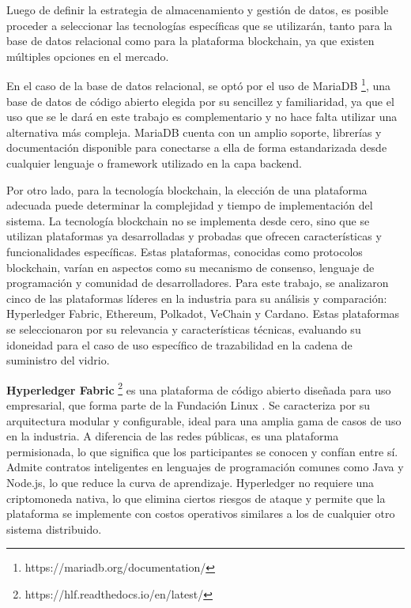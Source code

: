 Luego de definir la estrategia de almacenamiento y gestión de datos, es posible proceder a seleccionar las tecnologías específicas que se utilizarán, tanto para la base de datos relacional como para la plataforma blockchain, ya que existen múltiples opciones en el mercado.

En el caso de la base de datos relacional, se optó por el uso de MariaDB \footnote{https://mariadb.org/documentation/}, una base de datos de código abierto elegida por su sencillez y familiaridad, ya que el uso que se le dará en este trabajo es complementario y no hace falta utilizar una alternativa más compleja. MariaDB cuenta con un amplio soporte, librerías y documentación disponible para conectarse a ella de forma estandarizada desde cualquier lenguaje o framework utilizado en la capa backend.

Por otro lado, para la tecnología blockchain, la elección de una plataforma adecuada puede determinar la complejidad y tiempo de implementación del sistema.  La tecnología blockchain no se implementa desde cero, sino que se utilizan plataformas ya desarrolladas y probadas que ofrecen características y funcionalidades específicas. Estas plataformas, conocidas como protocolos blockchain, varían en aspectos como su mecanismo de consenso, lenguaje de programación y comunidad de desarrolladores. Para este trabajo, se analizaron cinco de las plataformas líderes en la industria para su análisis y comparación: Hyperledger Fabric, Ethereum, Polkadot, VeChain y Cardano. Estas plataformas se seleccionaron por su relevancia y características técnicas, evaluando su idoneidad para el caso de uso específico de trazabilidad en la cadena de suministro del vidrio.

\textbf{Hyperledger Fabric} \footnote{https://hlf.readthedocs.io/en/latest/}
es una plataforma de código abierto diseñada para uso empresarial, que forma parte de la Fundación Linux \cite{androulaki2018hyperledger}. Se caracteriza por su arquitectura modular y configurable, ideal para una amplia gama de casos de uso en la industria. A diferencia de las redes públicas, es una plataforma permisionada, lo que significa que los participantes se conocen y confían entre sí. Admite contratos inteligentes en lenguajes de programación comunes como Java y Node.js, lo que reduce la curva de aprendizaje. Hyperledger no requiere una criptomoneda nativa, lo que elimina ciertos riesgos de ataque y permite que la plataforma se implemente con costos operativos similares a los de cualquier otro sistema distribuido.

